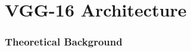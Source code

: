 \documentclass[a4paper,12pt]{article}
\begin{document}




\section{VGG-16 Architecture}

\subsubsection{Theoretical Background}
\end{document}
